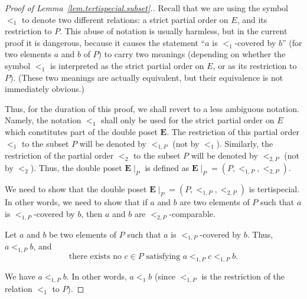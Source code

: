 \documentclass[12pt]{article}
\theoremstyle{plain}
\theoremstyle{definition}
\theoremstyle{remark}
\newcommand{\EE}{{\mathbf{E}}}
\begin{document}
\begin{proof}[Proof of Lemma~\ref{lem.tertispecial.subset}.]
Recall that we are using the symbol $<_1$ to denote two
different relations:
a strict partial order on $E$, and its restriction to $P$.
This abuse of notation is usually harmless, but in the
current proof it is dangerous, because it causes the statement
``$a$ is $<_1$-covered by $b$'' (for two elements $a$ and
$b$ of $P$) to carry two meanings (depending on whether the
symbol $<_1$ is interpreted as the strict partial order on
$E$, or as its restriction to $P$). (These two meanings are
actually equivalent, but their equivalence is not immediately
obvious.)

Thus, for the duration of this proof, we shall revert to a
less ambiguous notation. Namely, the notation $<_1$ shall
only be used for the strict partial order on $E$ which
constitutes part of the double poset $\EE$. The restriction
of this partial order $<_1$ to the subset $P$ will be denoted
by $<_{1,P}$ (not by $<_1$). Similarly, the restriction of
the partial order $<_2$ to the subset $P$ will be denoted by
$<_{2,P}$ (not by $<_2$). Thus, the double poset
$\EE\mid_P$ is defined as
$\EE\mid_P = \left(P, <_{1,P}, <_{2,P}\right)$.

We need to show that the double poset
$\EE\mid_P = \left(P, <_{1,P}, <_{2,P}\right)$ is
tertispecial. In other words, we need to show that if $a$
and $b$ are two elements of $P$ such that $a$ is
$<_{1,P}$-covered by $b$, then $a$ and $b$
are $<_{2,P}$-comparable.

Let $a$ and $b$ be two elements of $P$ such that $a$ is
$<_{1,P}$-covered by $b$. Thus,
$a <_{1,P} b$, and
\begin{equation}
\text{there exists no } c \in P \text{ satisfying }
a <_{1,P} c <_{1,P} b .
\label{pf.lem.tertispecial.subset.1}
\end{equation}

We have $a <_{1,P} b$. In other words, $a <_1 b$ (since
$<_{1,P}$ is the restriction of the relation $<_1$ to $P$).


\end{proof}
\end{document}
